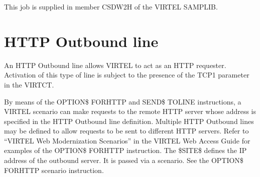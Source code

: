 \documentclass[letterpaper,10pt,english]{sphinxmanual}
\begin{document}
\begin{sphinxVerbatim}[commandchars=\\\{\}]
   
    
   
    
   
    
\end{sphinxVerbatim}

\sphinxAtStartPar
This job is supplied in member CSDW2H of the VIRTEL SAMPLIB.

\ignorespaces 

\section{HTTP Outbound line}
\label{\detokenize{connectivity_guide:http-outbound-line}}\label{\detokenize{connectivity_guide:v461cn-httpoutbound}}\label{\detokenize{connectivity_guide:index-15}}
\sphinxAtStartPar
An HTTP Outbound line allows VIRTEL to act as an HTTP requester. Activation of this type of line is subject to the presence of the TCP1 parameter in the VIRTCT.

\sphinxAtStartPar
By means of the OPTION\$ FOR\sphinxhyphen{}HTTP and SEND\$ TO\sphinxhyphen{}LINE instructions, a VIRTEL scenario can make requests to the remote HTTP server whose address is specified in the HTTP Outbound line definition. Multiple HTTP Outbound lines may be defined to allow requests to be sent to different HTTP servers. Refer to “VIRTEL Web Modernization Scenarios” in the VIRTEL Web Access Guide for examples of the OPTION\$ FOR\sphinxhyphen{}HTTP instruction. The \$SITE\$ defines the IP address of the outbound server. It is passed via a scenario. See the OPTION\$ FOR\sphinxhyphen{}HTTP scenario instruction.
\end{document}
